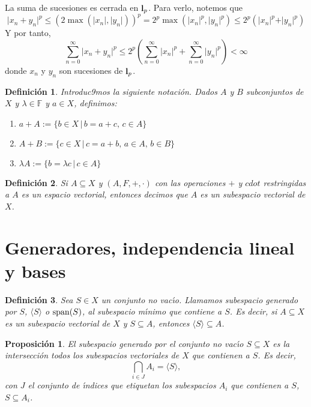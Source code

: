 \documentclass[12pt]{book}
\newtheorem{defn}{\bf Definición}[chapter]
\newtheorem{prop}{\bf Proposición}[chapter]
\begin{document}
La suma de sucesiones es cerrada en ${\bf l}_p$. Para verlo, notemos que
$$\vert x_n + y_n\vert^p \leq \left(2\max(\vert x_n\vert,\vert y_n\vert)\right)^p = 2^p \max(\vert 
x_n\vert^p,\vert y_n\vert^p)\leq 2^p\left(\vert x_n\vert^p + \vert y_n\vert^p\right)$$
Y por tanto,
$$\sum_{n=0}^\infty \vert x_n + y_n\vert^p \leq 2^p\left(\sum_{n=0}^\infty \vert x_n\vert^p + 
\sum_{n=0}^\infty \vert y_n\vert^p \right)<\infty$$
donde $x_n$ y $y_n$ son sucesiones de ${\bf l}_p$.

\begin{defn} Introduc9mos la siguiente notaci\'on. Dados $A$ y $B$ subconjuntos de $X$ y $
\lambda \in\mathbb{F} $  y $a\in X$,  definimos:
\begin{enumerate}
\item $a + A := \{ b\in X \,|\, b=a+c,\, c\in A\}$ 
\item $A+B := \{ c\in X \,|\, c=a+b,\, a\in A, \, b\in B\}$
\item $\lambda A := \{b=\lambda c\,|\, c\in A\}$
\end{enumerate}
\end{defn}
\begin{defn}Si $A\subseteq X$ y $(A,F,+,\cdot)$ con las operaciones $+$ y $cdot$ restringidas a 
$A$ es un espacio vectorial, entonces decimos que $A$ es un subespacio vectorial de $X$.
\end{defn} 

\section{Generadores, independencia lineal y bases}

\begin{defn} Sea $S\in X$ un conjunto no vac\'{\i}o. Llamamos {\it subespacio generado}  por $S$, 
$\langle S\rangle$ o ${\rm span}(S)$, al subespacio m\'{\i}nimo que contiene a $S$. Es decir, si 
$A\subseteq X$ es un subespacio vectorial de $X$  y $S\subseteq A$, entonces $\langle 
S\rangle\subseteq A$.
\end{defn}

\begin{prop} El subespacio generado por el conjunto no vac\'{\i}o $S\subseteq X$ es la 
intersecci\'on   todos los subespacios vectoriales de $X$ que contienen a $S$. Es decir,
$$ \bigcap_{i\in J} A_i =\langle S\rangle,$$
con $J$ el conjunto de \'{\i}ndices que etiquetan los subespacios $A_i$ que contienen a $S$,  
$S\subseteq A_i$.
\end{prop}
\end{document}
